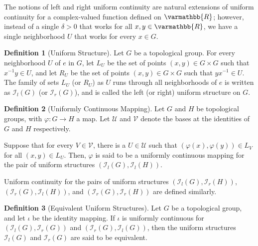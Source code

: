 \documentclass[10pt]{extarticle}
\newcommand{\R}{\mathbb{R}}
\theoremstyle{plain}
\theoremstyle{definition}
\newtheorem*{definition}{Definition}
\theoremstyle{note}
\renewcommand*{\mathbb}[1]{\varmathbb{#1}}
\renewcommand{\newline}{\hfill\break}
\begin{document}
The notions of left and right uniform continuity are natural extensions of uniform continuity for a complex-valued function defined on $\R$; however, instead of a single $\delta > 0$ that works for all $x,y\in \R$, we have a single neighborhood $U$ that works for every $x\in G$.
\begin{definition}[Uniform Structure]
  Let $G$ be a topological group. For every neighborhood $U$ of $e$ in $G$, let $L_{U}$ be the set of points $(x,y)\in G\times G$ such that $x^{-1}y\in U$, and let $R_U$ be the set of points $(x,y)\in G\times G$ such that $yx^{-1}\in U$. The family of sets $L_U$ (or $R_U$) as $U$ runs through all neighborhoods of $e$ is written as $\mathcal{I}_{l}\left(G\right)$ (or $\mathcal{I}_{r}\left(G\right)$), and is called the left (or right) uniform structure on $G$.
\end{definition}
\begin{definition}[Uniformly Continuous Mapping]
  Let $G$ and $H$ be topological groups, with $\varphi: G\rightarrow H$ a map. Let $\mathcal{U}$ and $\mathcal{V}$ denote the bases at the identities of $G$ and $H$ respectively.\newline

  Suppose that for every $V\in \mathcal{V}$, there is a $U\in \mathcal{U}$ such that $\left(\varphi(x),\varphi(y)\right)\in L_{V}$ for all $(x,y)\in L_U$. Then, $\varphi$ is said to be a uniformly continuous mapping for the pair of uniform structures $\left(\mathcal{I}_{l}\left(G\right),\mathcal{I}_{l}\left(H\right)\right)$.\newline

  Uniform continuity for the pairs of uniform structures $\left(\mathcal{I}_l\left(G\right),\mathcal{I}_r\left(H\right)\right)$, $\left(\mathcal{I}_r\left(G\right),\mathcal{I}_l\left(H\right)\right)$, and $\left(\mathcal{I}_r\left(G\right),\mathcal{I}_r\left(H\right)\right)$ are defined similarly.
\end{definition}
\begin{definition}[Equivalent Uniform Structures]
  Let $G$ be a topological group, and let $\iota$ be the identity mapping. If $\iota$ is uniformly continuous for $\left(\mathcal{I}_l(G),\mathcal{I}_r(G)\right)$ and $\left(\mathcal{I}_r(G),\mathcal{I}_l(G)\right)$, then the uniform structures $\mathcal{I}_l(G)$ and $\mathcal{I}_r(G)$ are said to be equivalent.
\end{definition}
\end{document}
